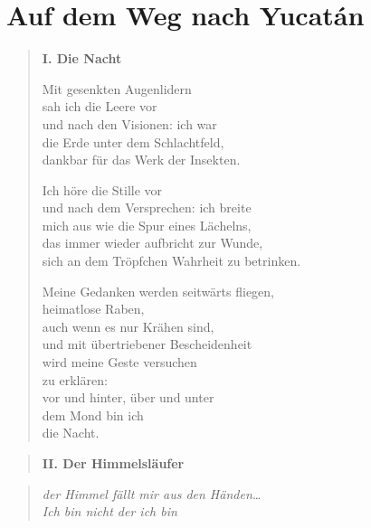 
\cleartoverso

\section{Auf dem Weg nach Yucatán}


\begin{verse}

{\bfseries I. Die Nacht}

Mit gesenkten Augenlidern\\
sah ich die Leere vor\\
und nach den Visionen: ich war\\
die Erde unter dem Schlachtfeld,\\
dankbar für das Werk der Insekten.

Ich höre die Stille vor\\
und nach dem Versprechen: ich breite\\
mich aus wie die Spur eines Lächelns,\\
das immer wieder aufbricht zur Wunde,\\
sich an dem Tröpfchen Wahrheit zu betrinken.

Meine Gedanken werden seitwärts fliegen,\\
heimatlose Raben,\\
auch wenn es nur Krähen sind,\\
und mit übertriebener Bescheidenheit\\
wird meine Geste versuchen\\
zu erklären:\\
vor und hinter, über und unter\\
dem Mond bin ich\\
die Nacht.
\end{verse}

\clearpage

\begin{verse}
{\bfseries II. Der Himmelsläufer}
\end{verse}

\begin{quote}
\itshape\smaller
der Himmel fällt mir aus den Händen\ldots\\
Ich bin nicht der ich bin

\end{quote}


